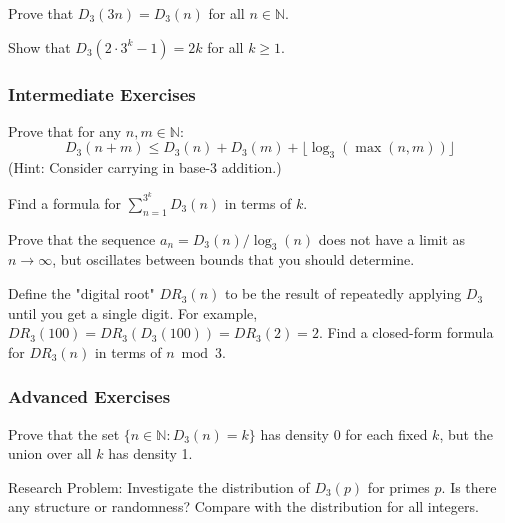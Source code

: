 \begin{exercise}[1.2.4]
Prove that $D_3(3n) = D_3(n)$ for all $n \in \mathbb{N}$.
\end{exercise}

\begin{exercise}[1.2.5]
Show that $D_3(2 \cdot 3^k - 1) = 2k$ for all $k \geq 1$.
\end{exercise}

\subsubsection*{Intermediate Exercises}

\begin{exercise}[1.2.6]
Prove that for any $n, m \in \mathbb{N}$:
$$D_3(n + m) \leq D_3(n) + D_3(m) + \lfloor \log_3(\max(n,m)) \rfloor$$
(Hint: Consider carrying in base-3 addition.)
\end{exercise}

\begin{exercise}[1.2.7]
Find a formula for $\sum_{n=1}^{3^k} D_3(n)$ in terms of $k$.
\end{exercise}

\begin{exercise}[1.2.8]
Prove that the sequence $a_n = D_3(n)/\log_3(n)$ does not have a limit as $n \to \infty$, but oscillates between bounds that you should determine.
\end{exercise}

\begin{exercise}[1.2.9]
Define the "digital root" $DR_3(n)$ to be the result of repeatedly applying $D_3$ until you get a single digit. For example, $DR_3(100) = DR_3(D_3(100)) = DR_3(2) = 2$. Find a closed-form formula for $DR_3(n)$ in terms of $n \bmod 3$.
\end{exercise}

\subsubsection*{Advanced Exercises}

\begin{exercise}[1.2.10]
Prove that the set $\{n \in \mathbb{N} : D_3(n) = k\}$ has density $0$ for each fixed $k$, but the union over all $k$ has density 1.
\end{exercise}

\begin{exercise}[1.2.11]
Research Problem: Investigate the distribution of $D_3(p)$ for primes $p$. Is there any structure or randomness? Compare with the distribution for all integers.
\end{exercise}

